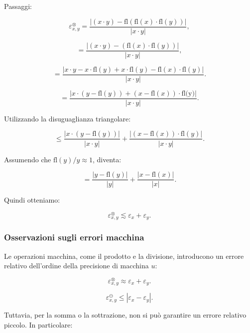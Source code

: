 \documentclass[a4paper, 11pt]{article}
\begin{document}
        Passaggi:


        \[
        \varepsilon^{\otimes }_{x,y} = \frac{|(x \cdot y) - \text{fl}(\text{fl}(x) \cdot \text{fl}(y))|}{|x \cdot y|},
        \]




        \[
        = \frac{|(x \cdot y) - (\text{fl}(x) \cdot \text{fl}(y))|}{|x \cdot y|},
        \]




        \[
        = \frac{|x \cdot y - x \cdot \text{fl}(y) + x \cdot \text{fl}(y) - \text{fl}(x) \cdot \text{fl}(y)|}{|x \cdot y|}.
        \]


        \[
        = \frac{|x \cdot (y-\text{fl}(y)) + (x -\text{fl}(x)) \cdot \text{fl(y)}|}{|x \cdot y|}.
        \]
    



        Utilizzando la disuguaglianza triangolare:


        \[
        \leq \frac{|x \cdot (y - \text{fl}(y))|}{|x \cdot y|} + \frac{|(x - \text{fl}(x)) \cdot \text{fl}(y)|}{|x \cdot y|}.
        \]



        Assumendo che \( \text{fl}(y) / y \approx 1 \), diventa:


        \[
        = \frac{|y - \text{fl}(y)|}{|y|} + \frac{|x - \text{fl}(x)|}{|x|}.
        \]



        Quindi otteniamo:


        \[
        \varepsilon^{\otimes }_{x, y} \lesssim \varepsilon_x + \varepsilon_y.
        \]


        \subsubsection*{Osservazioni sugli errori macchina}

        Le operazioni macchina, come il prodotto e la divisione, introducono un errore relativo dell'ordine della precisione di macchina \( u \):


        \[
        \varepsilon_{x,y}^{\otimes} \approx \varepsilon_x + \varepsilon_y.
        \]

        \[
        \varepsilon_{x,y}^{\ominus} \leq |\varepsilon_x - \varepsilon_y|.
        \]



        Tuttavia, per la somma o la sottrazione, non si può garantire un errore relativo piccolo. In particolare:
\end{document}
